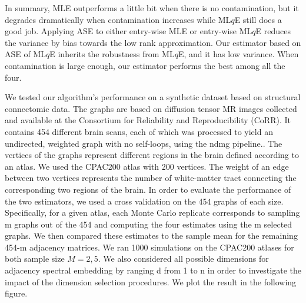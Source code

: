 \documentclass[simplex.tex]{subfiles}
\begin{document}
In summary, MLE outperforms a little bit when there is no contamination,
but it degrades dramatically when contamination increases while ML$q$E
still does a good job. Applying ASE to either entry-wise MLE or
entry-wise ML$q$E reduces the variance by bias towards the low rank
approximation. Our estimator based on ASE of ML$q$E inherits the
robustness from ML$q$E, and it has low variance. When contamination is
large enough, our estimator performs the best among all the four.


We tested our algorithm’s performance on a synthetic dataset based on
structural connectomic data. The graphs are based on diffusion tensor MR
images collected and available at the Consortium for Reliability and
Reproducibility (CoRR). It contains 454 different brain scans, each of
which was processed to yield an undirected, weighted graph with no
self-loops, using the ndmg pipeline..  The vertices of the graphs
represent different regions in the brain defined according to an atlas.
We used the  CPAC200 atlas with 200 vertices. The weight of an edge
between two vertices represents the number of white-matter tract
connecting the corresponding two regions of the brain. In order to
evaluate the performance of the two estimators, we used a cross
validation on the 454 graphs of each size. Specifically, for a given
atlas, each Monte Carlo replicate corresponds to sampling m graphs out
of the 454 and computing the four estimates using the m selected graphs.
We then compared these estimates to the sample mean for the remaining
454-m adjacency matrices.  We ran 1000 simulations on the CPAC200
atlases for both sample size $M=2, 5$.  We also considered all possible
dimensions for adjacency spectral embedding by ranging d from 1 to n in
order to investigate the impact of the dimension selection procedures.
We plot the result in the following figure.
\end{document}
